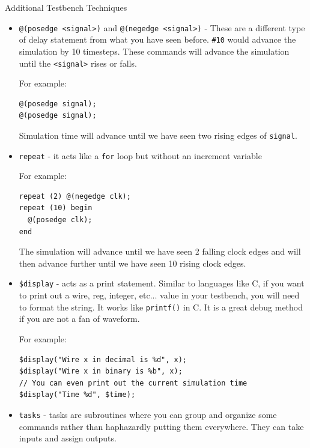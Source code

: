 \documentclass[11pt]{article}
\makeatletter
\renewcommand{\section}
{\@startsection {section}{1}{0pt}
 {-2ex}
 {1ex}
 {\bfseries\Large}}
\makeatother
\begin{document}
\section{Additional Testbench Techniques}

\begin{itemize}
\item \verb|@(posedge <signal>)| and \verb|@(negedge <signal>)| - These are a different type of delay statement from what you have seen before. \verb|#10| would advance the simulation by 10 timesteps. These commands will advance the simulation until the \verb|<signal>| rises or falls.

For example:
\begin{verbatim}
@(posedge signal);
@(posedge signal);
\end{verbatim}

Simulation time will advance until we have seen two rising edges of \verb|signal|.

\item \verb|repeat| - it acts like a \verb|for| loop but without an increment variable

For example:
\begin{verbatim}
repeat (2) @(negedge clk);
repeat (10) begin
  @(posedge clk);
end
\end{verbatim}

The simulation will advance until we have seen 2 falling clock edges and will then advance further until we have seen 10 rising clock edges.

\item \verb|$display| - acts as a print statement. Similar to languages like C, if you want to print out a wire, reg, integer, etc... value in your testbench, you will need to format the string. It works like \verb|printf()| in C. It is a great debug method if you are not a fan of waveform.

For example:
\begin{verbatim}
$display("Wire x in decimal is %d", x);
$display("Wire x in binary is %b", x);
// You can even print out the current simulation time
$display("Time %d", $time);
\end{verbatim}

\item \verb|tasks| - tasks are subroutines where you can group and organize some commands rather than haphazardly putting them everywhere. They can take inputs and assign outputs.


\end{itemize}
\end{document}
